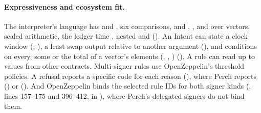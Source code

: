 \paragraph{Expressiveness and ecosystem fit.} The interpreter's language has
 and , six comparisons,  and , ,
 and  over vectors, scaled arithmetic, the ledger time
, nested  and 
(). An Intent can state a clock window
(, ), a least swap output relative to another argument
(), and conditions on every, some or the total of a vector's elements
(, , ) (). A rule can read
up to  values from other contracts. Multi-signer
rules use OpenZeppelin's threshold policies. A refusal reports a specific code
for each reason (), where Perch
reports  () or
 (). And OpenZeppelin
 binds the selected rule IDs for both signer kinds
(, lines 157--175 and 396--412, in ), where Perch's
delegated signers do not bind them.
